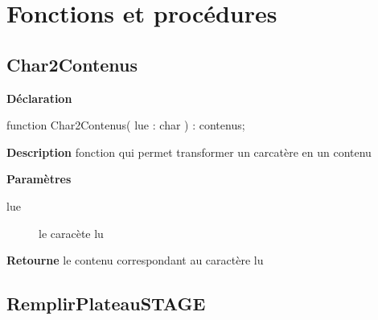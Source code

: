 \documentclass{report}
\newif\ifpdf
\begin{document}
\section{Fonctions et procédures}
\ifpdf
\subsection*{\large{\textbf{Char2Contenus}}\normalsize\hspace{1ex}\hrulefill}
\else
\subsection*{Char2Contenus}
\fi
\label{Stage-Char2Contenus}
\begin{list}{}{
\setlength{\itemindent}{0cm}
\setlength{\listparindent}{0cm}
\setlength{\leftmargin}{\evensidemargin}
\addtolength{\leftmargin}{\tmplength}
\settowidth{\labelsep}{X}
\addtolength{\leftmargin}{\labelsep}
\setlength{\labelwidth}{\tmplength}
}
\item[\textbf{Déclaration}\hfill]
\ifpdf
\begin{flushleft}
\fi
\begin{ttfamily}
function Char2Contenus( lue : char ) : contenus;\end{ttfamily}

\ifpdf
\end{flushleft}
\fi

\par
\item[\textbf{Description}]
fonction qui permet transformer un carcatère en un contenu  \par
\item[\textbf{Paramètres}]
\begin{description}
\item[lue] le caracète lu
\end{description}
\item[\textbf{Retourne}]le contenu correspondant au caractère lu


\end{list}
\ifpdf
\subsection*{\large{\textbf{RemplirPlateauSTAGE}}\normalsize\hspace{1ex}\hrulefill}
\else
\end{document}
